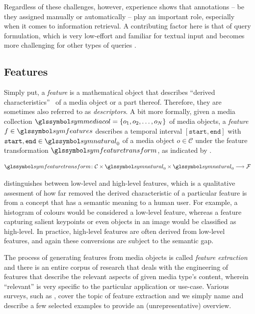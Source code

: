 Regardless of these challenges, however, experience shows that annotations -- be they assigned manually or automatically -- play an important role, especially when it comes to information retrieval. A contributing factor here is that of query formulation, which is very low-effort and familiar for textual input and becomes more challenging for other types of queries .

\subsection{Features}
Simply put, a \emph{feature} is a mathematical object that describes ``derived characteristics''~\cite{Blanken:2007multimedia} of a media object or a part thereof. Therefore, they are sometimes also referred to as \emph{descriptors}. A bit more formally, given a media collection $\symmediacol = \lbrace o_1, o_2, \ldots, o_N \rbrace$ of media objects, a \emph{feature} $f \in \symfeatures$ describes a temporal interval $[ \texttt{start}, \texttt{end} ]$ with $\texttt{start},\texttt{end} \in \symnatural_0$ of a media object $o \in \mathcal{C}$ under the feature transformation $\symfeaturetransform$, as indicated by .

\begin{equation}
    \label{eq:feature_transformation}
    \symfeaturetransform \colon \mathcal{C} \times \symnatural_0 \times \symnatural_0 \longrightarrow \mathcal{F}
\end{equation}

\cite{Blanken:2007multimedia} distinguishes between low-level and high-level features, which is a qualitative assesment of how far removed the derived characteristic of a particular feature is from a concept that has a semantic meaning to a human user. For example, a histogram of colours would be considered a low-level feature, whereas a feature capturing salient keypoints or even objects in an image would be classified as high-level. In practice, high-level features are often derived from low-level features, and again these conversions are subject to the semantic gap.

The process of generating features from media objects is called \emph{feature extraction} \cite{Blanken:2007multimedia} and there is an entire corpus of research that deals with the engineering of features that describe the relevant aspects of given media type's content, wherein ``relevant'' is very specific to the particular application or use-case. Various surveys, such as \cite{Ding:2012ASurvey,McKinney:2003Features,Salau:2019Feature}, cover the topic of feature extraction and we simply name and describe a few selected examples to provide an (unrepresentative) overview. 

